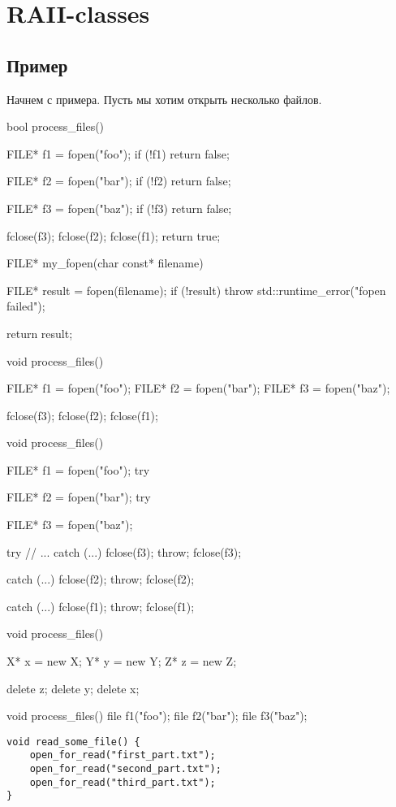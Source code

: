 \section{RAII-classes}
\subsection{Пример}
Начнем с примера. Пусть мы хотим открыть несколько файлов.

bool process_files()
{
    FILE* f1 = fopen("foo");
    if (!f1)
        return false;

    FILE* f2 = fopen("bar");
    if (!f2)
        return false;

    FILE* f3 = fopen("baz");
    if (!f3)
        return false;

    fclose(f3);
    fclose(f2);
    fclose(f1);
    return true;
}


FILE* my_fopen(char const* filename)
{
    FILE* result = fopen(filename);
    if (!result)
        throw std::runtime_error("fopen failed");

    return result;
}

void process_files()
{
    FILE* f1 = fopen("foo");
    FILE* f2 = fopen("bar");
    FILE* f3 = fopen("baz");

    fclose(f3);
    fclose(f2);
    fclose(f1);
}

void process_files()
{
    FILE* f1 = fopen("foo");
    try
    {
        FILE* f2 = fopen("bar");
        try
        {
            FILE* f3 = fopen("baz");

            try
            {
                // ...
            }
            catch (...)
            {
                fclose(f3);
                throw;
            }
            fclose(f3);
        }
        catch (...)
        {
            fclose(f2);
            throw;
        }
        fclose(f2);
    }
    catch (...)
    {
        fclose(f1);
        throw;
    }
    fclose(f1);
}

void process_files()
{
    X* x = new X;
    Y* y = new Y;
    Z* z = new Z;

    delete z;
    delete y;
    delete x;
}

void process_files()
{
    file f1("foo");
    file f2("bar");
    file f3("baz");
}

\begin{verbatim}
void read_some_file() {
    open_for_read("first_part.txt");
    open_for_read("second_part.txt");
    open_for_read("third_part.txt");
}
\end{verbatim}

